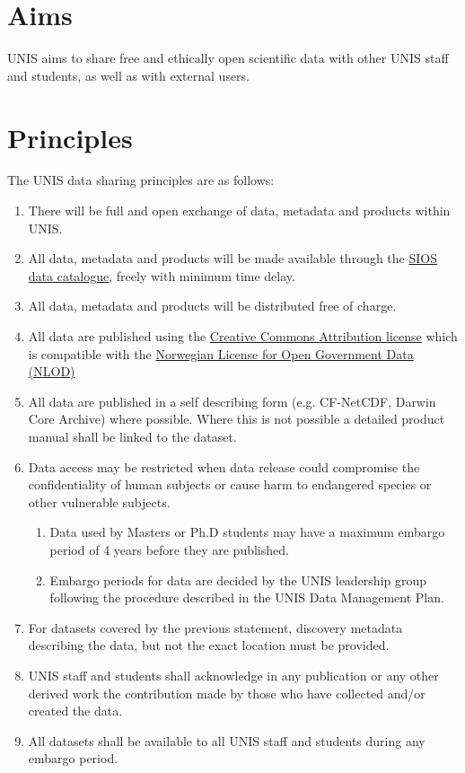 \documentclass[a4paper,english, 11pt]{article}
\begin{document}
\section{Aims}
\label{s:aims}

UNIS aims to share free and ethically open scientific data with other UNIS staff and students, as well as with external users. 

\section{Principles}
\label{s:principles}

The UNIS data sharing principles are as follows:

\begin{enumerate}[I]
\item There will be full and open exchange of data, metadata and products within UNIS.
\item All data, metadata and products will be made available through the \href{https://sios-svalbard.org/metsis/search}{SIOS data catalogue}, freely with minimum time delay.
\item All data, metadata and products will be distributed free of charge.
\item All data are published using the \href{https://creativecommons.org/licenses/by/4.0/}{Creative Commons Attribution license} which is
compatible with the \href{https://data.norge.no/nlod/en}{Norwegian License for Open Government Data (NLOD)}
\item All data are published in a self describing form (e.g. CF-NetCDF, Darwin Core Archive) where possible. Where this is not possible a detailed product manual shall be linked to the dataset.
\item Data access may be restricted when data release could compromise the confidentiality
of human subjects or cause harm to endangered species or other vulnerable subjects.
\begin{enumerate}[A]
\item Data used by Masters or Ph.D students may have a maximum embargo period of 4 years before
they are published.
\item Embargo periods for data are decided by the UNIS leadership group
following the procedure described in the UNIS Data Management Plan.
\end{enumerate}
\item For datasets covered by the previous statement, discovery metadata describing the data, but not the exact location must be provided.
\item UNIS staff and students shall acknowledge in any publication or any other derived work the contribution made by those who have collected and/or created the data.
\item All datasets shall be available to all UNIS staff and students during any embargo period.
\end{enumerate}
\end{document}
